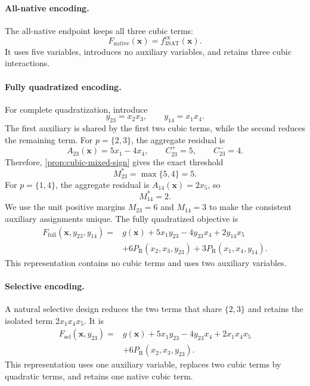 \documentclass[a4paper,onecolumn,11pt,unpublished]{quantumarticle}
\newcommand{\PR}{P_{\mathrm R}}
\theoremstyle{remark}
\begin{document}
\paragraph{All-native encoding.}
The all-native endpoint keeps all three cubic terms:
\begin{equation}
    F_{\mathrm{native}}(\bm x)
    =f_{\mathrm{3SAT}}^{\mathrm{ex}}(\bm x).
    \label{eq:max3sat-worked-native}
\end{equation}
It uses five variables, introduces no auxiliary variables, and retains three
cubic interactions.

\paragraph{Fully quadratized encoding.}
For complete quadratization, introduce
\begin{equation}
    y_{23}=x_2x_3,
    \qquad
    y_{14}=x_1x_4.
    \label{eq:max3sat-worked-full-auxiliaries}
\end{equation}
The first auxiliary is shared by the first two cubic terms, while the second
reduces the remaining term. For $p=\{2,3\}$, the aggregate residual is
\begin{equation}
    A_{23}(\bm x)=5x_1-4x_4,
    \qquad
    C_{23}^{+}=5,
    \qquad
    C_{23}^{-}=4.
\end{equation}
Therefore, \cref{prop:cubic-mixed-sign} gives the exact threshold
\begin{equation}
    M_{23}^{*}=\max\{5,4\}=5.
\end{equation}
For $p=\{1,4\}$, the aggregate residual is $A_{14}(\bm x)=2x_5$, so
\begin{equation}
    M_{14}^{*}=2.
\end{equation}
We use the unit positive margins $M_{23}=6$ and $M_{14}=3$ to make the
consistent auxiliary assignments unique. The fully quadratized objective is
\begin{align}
    F_{\mathrm{full}}(\bm x,y_{23},y_{14})
    ={}&g(\bm x)+5x_1y_{23}-4y_{23}x_4+2y_{14}x_5 \nonumber\\
      &+6\PR(x_2,x_3,y_{23})
       +3\PR(x_1,x_4,y_{14}).
    \label{eq:max3sat-worked-full}
\end{align}
This representation contains no cubic terms and uses two auxiliary variables.

\paragraph{Selective encoding.}
A natural selective design reduces the two terms that share $\{2,3\}$ and
retains the isolated term $2x_1x_4x_5$. It is
\begin{align}
    F_{\mathrm{sel}}(\bm x,y_{23})
    ={}&g(\bm x)+5x_1y_{23}-4y_{23}x_4+2x_1x_4x_5 \nonumber\\
      &+6\PR(x_2,x_3,y_{23}).
    \label{eq:max3sat-worked-selective}
\end{align}
This representation uses one auxiliary variable, replaces two cubic terms by
quadratic terms, and retains one native cubic term.
\end{document}
